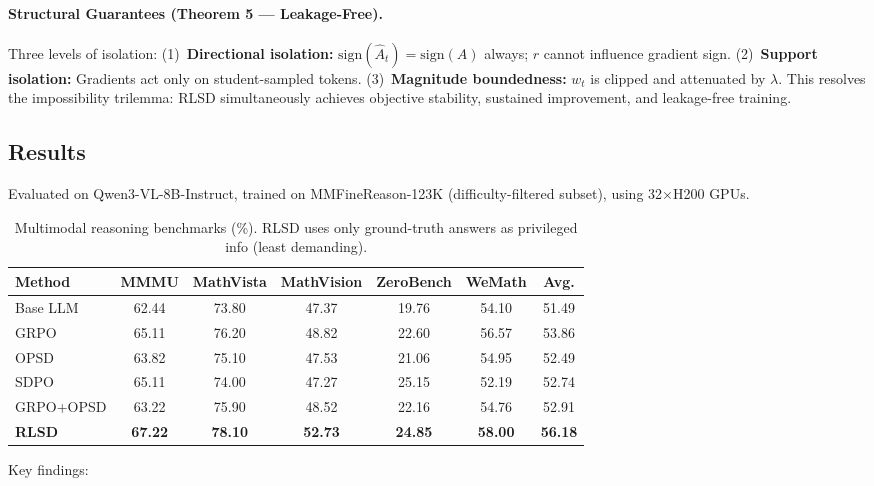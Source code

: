 \documentclass[11pt]{article}
\begin{document}
\paragraph{Structural Guarantees (Theorem 5 --- Leakage-Free).}
Three levels of isolation: (1)~\textbf{Directional isolation:} $\mathrm{sign}(\hat{A}_t) = \mathrm{sign}(A)$ always; $r$ cannot influence gradient sign. (2)~\textbf{Support isolation:} Gradients act only on student-sampled tokens. (3)~\textbf{Magnitude boundedness:} $w_t$ is clipped and attenuated by $\lambda$. This resolves the impossibility trilemma: RLSD simultaneously achieves objective stability, sustained improvement, and leakage-free training.

\subsection{Results}

Evaluated on Qwen3-VL-8B-Instruct, trained on MMFineReason-123K (difficulty-filtered subset), using 32$\times$H200 GPUs.

\begin{table}[h]
\centering
\caption{Multimodal reasoning benchmarks (\%). RLSD uses only ground-truth answers as privileged info (least demanding).}
\begin{tabular}{lcccccc}
\toprule
\textbf{Method} & \textbf{MMMU} & \textbf{MathVista} & \textbf{MathVision} & \textbf{ZeroBench} & \textbf{WeMath} & \textbf{Avg.} \\
\midrule
Base LLM & 62.44 & 73.80 & 47.37 & 19.76 & 54.10 & 51.49 \\
GRPO & 65.11 & 76.20 & 48.82 & 22.60 & 56.57 & 53.86 \\
OPSD & 63.82 & 75.10 & 47.53 & 21.06 & 54.95 & 52.49 \\
SDPO & 65.11 & 74.00 & 47.27 & 25.15 & 52.19 & 52.74 \\
GRPO+OPSD & 63.22 & 75.90 & 48.52 & 22.16 & 54.76 & 52.91 \\
\textbf{RLSD} & \textbf{67.22} & \textbf{78.10} & \textbf{52.73} & \textbf{24.85} & \textbf{58.00} & \textbf{56.18} \\
\bottomrule
\end{tabular}
\end{table}

Key findings:
\end{document}
